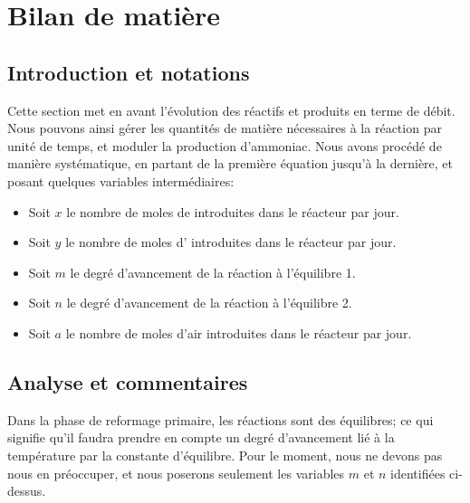 \documentclass{article}
\begin{document}
\section*{Bilan de matière}

\subsection*{Introduction et notations}

Cette section met en avant l'évolution des réactifs et produits en terme de débit. 
Nous pouvons ainsi gérer les quantités de matière nécessaires à la réaction par unité de temps, et
moduler la production d'ammoniac. Nous avons procédé de manière systématique, en partant de la première
équation jusqu'à la dernière, et posant quelques 
variables intermédiaires:

\begin{itemize}
	\item Soit $x$ le nombre de moles de  introduites dans le réacteur par jour.
	\item Soit $y$ le nombre de moles d' introduites dans le réacteur par jour.
	\item Soit $m$ le degré d'avancement de la réaction à l'équilibre 1.
	\item Soit $n$ le degré d'avancement de la réaction à l'équilibre 2.
	\item Soit $a$ le nombre de moles d'air introduites dans le réacteur par jour.
\end{itemize}

\subsection*{Analyse et commentaires}
Dans la phase de reformage primaire, les réactions sont des équilibres; ce qui signifie qu'il faudra prendre en 
compte un degré d'avancement lié à la température par la constante d'équilibre. Pour le moment, nous ne devons pas 
nous en préoccuper, et nous poserons seulement les variables $m$ et $n$ identifiées ci-dessus. 
\end{document}

